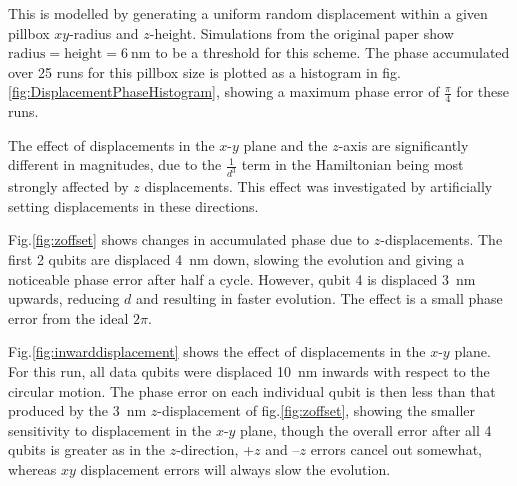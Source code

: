 \documentclass[%
 reprint,
 amsmath,amssymb,
 aps,
]{revtex4-1}
\begin{document}
This is modelled by generating a uniform random displacement within a given pillbox $xy$-radius and $z$-height. Simulations from the original paper show $\textrm{radius} = \textrm{height} = \SI{6}{\nano\metre}$ to be a threshold for this scheme. The phase accumulated over 25 runs for this pillbox size is plotted as a histogram in fig.\@ \ref{fig:DisplacementPhaseHistogram}, showing a maximum phase error of $\tfrac{\pi}{4}$ for these runs. 



The effect of displacements in the $x$-$y$ plane and the $z$-axis are significantly different in magnitudes, due to the $\tfrac{1}{d^3}$ term in the Hamiltonian being most strongly affected by $z$ displacements. This effect was investigated by artificially setting displacements in these directions.

Fig.\@ \ref{fig:zoffset} shows changes in accumulated phase due to $z$-displacements. The first 2 qubits are displaced \SI{4}{\nano\metre} down, slowing the evolution and giving a noticeable phase error after half a cycle. However, qubit 4 is displaced \SI{3}{\nano\metre} upwards, reducing $d$ and resulting in faster evolution. The effect is a small phase error from the ideal $2\pi$.

Fig.\@ \ref{fig:inwarddisplacement} shows the effect of displacements in the $x$-$y$ plane. For this run, all data qubits were displaced \SI{10}{\nano\metre} inwards with respect to the circular motion. The phase error on each individual qubit is then less than that produced by the \SI{3}{\nano\metre} $z$-displacement of fig.\@ \ref{fig:zoffset}, showing the smaller sensitivity to displacement in the $x$-$y$ plane, though the overall error after all 4 qubits is greater as in the $z$-direction, +$z$ and --$z$ errors cancel out somewhat, whereas $xy$ displacement errors will always slow the evolution.
\end{document}

